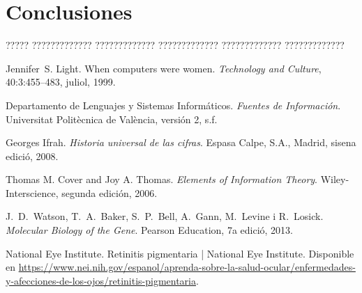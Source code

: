 \documentclass[11pt,spanish,listoffigures,listoftables]{tfgetsinf}
\begin{document}
\chapter{Conclusiones}

????? ????????????? ????????????? ????????????? ????????????? ????????????? 


\begin{thebibliography}{99}

   Jennifer~S. Light.
   \newblock When computers were women.
   \newblock \textit{Technology and Culture}, 40:3:455--483, juliol, 1999.

   Departamento de Lenguajes y Sistemas Informáticos.
   \newblock \textit{Fuentes de Información}.
   \newblock Universitat Politècnica de València, versión 2, s.f.
   
   Georges Ifrah.
   \newblock \textit{Historia universal de las cifras}.
   \newblock Espasa Calpe, S.A., Madrid, sisena edició, 2008.

   Thomas M. Cover and Joy A. Thomas.  
   \newblock \textit{Elements of Information Theory}.  
   \newblock Wiley-Interscience, segunda edición, 2006.

   J.~D.~Watson, T.~A.~Baker, S.~P.~Bell, A.~Gann, M.~Levine i R.~Losick.
   \newblock \textit{Molecular Biology of the Gene}.
   \newblock Pearson Education, 7a edició, 2013.


   National Eye Institute.  
   \newblock Retinitis pigmentaria | National Eye Institute.  
   \newblock Disponible en  
   \url{https://www.nei.nih.gov/espanol/aprenda-sobre-la-salud-ocular/enfermedades-y-afecciones-de-los-ojos/retinitis-pigmentaria}.


\end{thebibliography}
\end{document}
